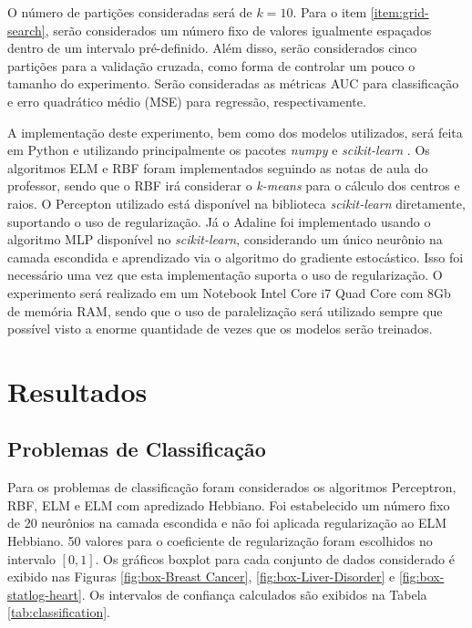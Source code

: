 \documentclass[conference]{IEEEtran}
\begin{document}
	O número de partições consideradas será de $k=10$. Para o item \ref{item:grid-search}, serão considerados um número fixo de valores igualmente espaçados  dentro de um intervalo pré-definido. Além disso, serão considerados cinco partições para a validação cruzada, como forma de controlar um pouco o tamanho do experimento. Serão consideradas as métricas AUC para classificação e erro quadrático médio (MSE) para regressão, respectivamente.
	
	A implementação deste experimento, bem como dos modelos utilizados, será feita em Python e utilizando principalmente os pacotes \textit{numpy} \cite{harris2020array} e \textit{scikit-learn} \cite{scikit-learn}. Os algoritmos ELM e RBF foram implementados seguindo as notas de aula do professor, sendo que o RBF irá considerar o \textit{k-means} para o cálculo dos centros e raios. O Percepton utilizado está disponível na biblioteca \textit{scikit-learn} diretamente, suportando o uso de regularização. Já o Adaline foi implementado usando o algoritmo MLP disponível no \textit{scikit-learn}, considerando um único neurônio na camada escondida e aprendizado via o algoritmo do gradiente estocástico. Isso foi necessário uma vez que esta implementação suporta o uso de regularização. O experimento será realizado em um Notebook Intel Core i7 Quad Core com 8Gb de memória RAM, sendo que o uso de paralelização será utilizado sempre que possível visto a enorme quantidade de vezes que os modelos serão treinados.
	
	\section{Resultados}
	
	\subsection{Problemas de Classificação}
	Para os problemas de classificação foram considerados os algoritmos Perceptron, RBF, ELM e ELM com apredizado Hebbiano. Foi estabelecido um número fixo de 20 neurônios na camada escondida e não foi aplicada regularização ao ELM Hebbiano. 50 valores para o coeficiente de regularização foram escolhidos no intervalo $[0,1]$. Os gráficos boxplot para cada conjunto de dados considerado é exibido nas Figuras \ref{fig:box-Breast Cancer}, \ref{fig:box-Liver-Disorder} e \ref{fig:box-statlog-heart}. Os intervalos de confiança calculados são exibidos na Tabela \ref{tab:classification}.
	
\end{document}
